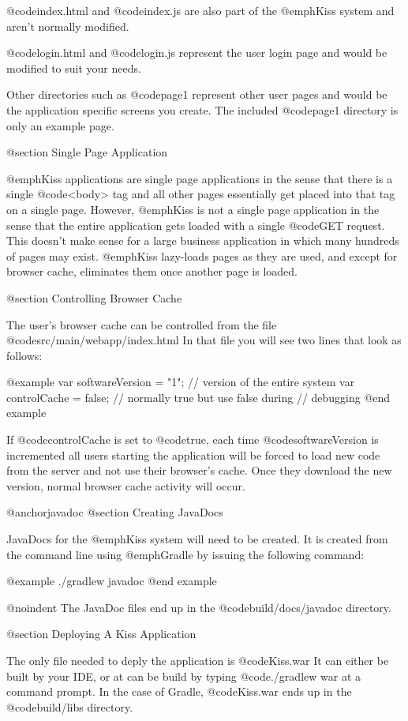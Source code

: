 @code{index.html} and @code{index.js} are also part of the @emph{Kiss}
system and aren't normally modified.

@code{login.html} and @code{login.js} represent the user login page
and would be modified to suit your needs.

Other directories such as @code{page1} represent other user pages and
would be the application specific screens you create.  The included
@code{page1} directory is only an example page.


@section Single Page Application

@emph{Kiss} applications are single page applications in the sense
that there is a single @code{<body>} tag and all other pages
essentially get placed into that tag on a single page.  However,
@emph{Kiss} is not a single page application in the sense that the
entire application gets loaded with a single @code{GET} request.  This
doesn't make sense for a large business application in which many
hundreds of pages may exist.  @emph{Kiss} lazy-loads pages as they are
used, and except for browser cache, eliminates them once another page
is loaded.

@section Controlling Browser Cache

The user's browser cache can be controlled from the file @code{src/main/webapp/index.html}  In that file you will see two lines that look as follows:

@example
var softwareVersion = "1";  // version of the entire system
var controlCache = false;   // normally true but use false during 
                            // debugging
@end example

If @code{controlCache} is set to @code{true}, each time @code{softwareVersion}
is incremented all users starting the application will be forced to
load new code from the server and not use their browser's cache.  Once
they download the new version, normal browser cache activity will
occur.


@anchor{javadoc} @section Creating JavaDocs

JavaDocs for the @emph{Kiss} system will need to be created.  It is created from the command line using @emph{Gradle} by issuing the
following command: 

@example
./gradlew javadoc
@end example

@noindent
The JavaDoc files end up in the @code{build/docs/javadoc} directory.


@section Deploying A Kiss Application

The only file needed to deply the application is @code{Kiss.war} It
can either be built by your IDE, or at can be build by typing
@code{./gradlew war} at a command prompt.  In the case of Gradle,
@code{Kiss.war} ends up in the @code{build/libs} directory.

